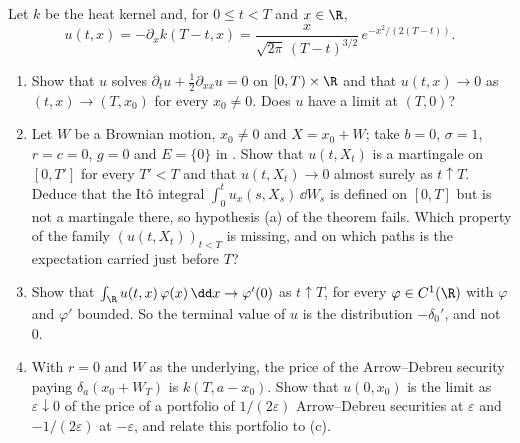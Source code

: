 \begin{exercise}[A dipole]\label{ex:sm-dipole}
\hard Let $k$ be the heat kernel  and, for $0\le t<T$ and $x\in\R$,
\[
  u(t,x)=-\partial_xk(T-t,x)=\frac{x}{\sqrt{2\pi}\,(T-t)^{3/2}}\,e^{-x^2/(2(T-t))} .
\]
\begin{enumerate}[label=(\alph*)]
  \item Show that $u$ solves $\partial_tu+\frac12\partial_{xx}u=0$ on $[0,T)\times\R$ and that
    $u(t,x)\to0$ as $(t,x)\to(T,x_0)$ for every $x_0\ne0$. Does $u$ have a limit at $(T,0)$?
  \item Let $W$ be a Brownian motion, $x_0\ne0$ and $X=x_0+W$; take $b=0$, $\sigma=1$, $r=c=0$,
    $g=0$ and $E=\{0\}$ in . Show that $u(t,X_t)$ is a martingale on
    $[0,T']$ for every $T'<T$ and that $u(t,X_t)\to0$ almost surely as $t\uparrow T$. Deduce that the
    It\^o integral $\int_0^tu_x(s,X_s)\,\dd W_s$ is defined on $[0,T]$ but is not a martingale there,
    so hypothesis (a) of the theorem fails. Which property of the family $(u(t,X_t))_{t<T}$ is
    missing, and on which paths is the expectation carried just before $T$?
  \item Show that $\int_\R u(t,x)\,\varphi(x)\,\dd x\to\varphi'(0)$ as $t\uparrow T$, for every
    $\varphi\in C^1(\R)$ with $\varphi$ and $\varphi'$ bounded. So the terminal value of $u$ is the
    distribution $-\delta_0'$, and not $0$.
  \item With $r=0$ and $W$ as the underlying, the price of the Arrow--Debreu security paying
    $\delta_a(x_0+W_T)$ is $k(T,a-x_0)$. Show that $u(0,x_0)$ is the limit as $\varepsilon\downarrow0$
    of the price of a portfolio of $1/(2\varepsilon)$ Arrow--Debreu securities at $\varepsilon$ and
    $-1/(2\varepsilon)$ at $-\varepsilon$, and relate this portfolio to (c).
\end{enumerate}
\end{exercise}

